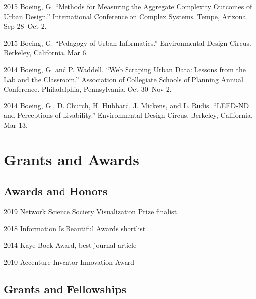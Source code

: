 \documentclass[12pt,letterpaper]{report}
\begin{document}
\begin{tablist}
		\item[2015] \tab Boeing, G. \enquote{Methods for Measuring the Aggregate Complexity Outcomes of Urban Design.} International Conference on Complex Systems. Tempe, Arizona. Sep 28--Oct 2.

		\item[2015] \tab Boeing, G. \enquote{Pedagogy of Urban Informatics.} Environmental Design Circus. Berkeley, California. Mar 6.

		\item[2014] \tab Boeing, G. and P. Waddell. \enquote{Web Scraping Urban Data: Lessons from the Lab and the Classroom.} Association of Collegiate Schools of Planning Annual Conference. Philadelphia, Pennsylvania. Oct 30--Nov 2.

		\item[2014] \tab Boeing, G., D. Church, H. Hubbard, J. Mickens, and L. Rudis. \enquote{LEED-ND and Perceptions of Livability.} Environmental Design Circus. Berkeley, California. Mar 13.

	\end{tablist}



	\section*{Grants and Awards}

	\subsection*{Awards and Honors}

	\begin{tablist}

		\item[2019] \tab Network Science Society Visualization Prize finalist

		\item[2018] \tab Information Is Beautiful Awards shortlist

		\item[2014] \tab Kaye Bock Award, best journal article

		\item[2010] \tab Accenture Inventor Innovation Award

	\end{tablist}

	\subsection*{Grants and Fellowships}
\end{document}
